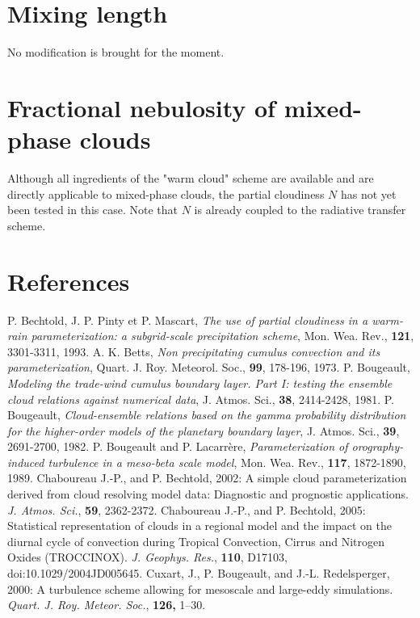 \section{Mixing length}

No modification is brought for the moment.

\section{Fractional nebulosity of mixed-phase clouds}

Although all ingredients of the "warm cloud" scheme are available and are
directly applicable to mixed-phase clouds, the partial cloudiness $N$ has not 
yet been tested in this case. Note that $N$ is already coupled to the radiative 
transfer scheme.




\section{References}

\por   P. { Bechtold}, J. P. { Pinty} et P. { Mascart},
           {\it The use of partial cloudiness in a warm-rain parameterization:
            a subgrid-scale precipitation scheme},
           Mon. Wea. Rev., {\bf 121}, 3301-3311, 1993.
\por  A. K. { Betts},
           {\it Non precipitating cumulus convection and its parameterization},
           Quart. J. Roy. Meteorol. Soc., {\bf 99}, 178-196, 1973.
\por  P. { Bougeault},
           {\it Modeling the trade-wind cumulus boundary layer.  Part I:
                testing the ensemble cloud relations against numerical data},
           J. Atmos. Sci., {\bf 38}, 2414-2428, 1981.
\por    P. { Bougeault},
           {\it Cloud-ensemble relations based on the gamma probability
           distribution for the higher-order models of the planetary
           boundary layer},
           J. Atmos. Sci., {\bf 39}, 2691-2700, 1982.
\por   P. { Bougeault} and P. { Lacarr\`ere},
           {\it Parameterization of orography-induced turbulence in a
                 meso-beta scale model},
           Mon. Wea. Rev., {\bf 117}, 1872-1890, 1989.
\por
Chaboureau J.-P., and P. Bechtold, 2002: A simple cloud parameterization derived from
cloud resolving model data: Diagnostic and prognostic applications.
{\it J. Atmos. Sci.}, {\bf 59}, 2362-2372.
\por
Chaboureau J.-P., and P. Bechtold, 2005: Statistical representation of clouds
in a regional model and the impact on the diurnal cycle of convection
during Tropical Convection, Cirrus and Nitrogen Oxides (TROCCINOX). 
{\it J. Geophys. Res.}, {\bf 110}, D17103, doi:10.1029/2004JD005645.
\por
Cuxart, J., P. Bougeault, and J.-L. Redelsperger, 2000:
A turbulence scheme allowing for mesoscale and large-eddy simulations.
{\it Quart. J. Roy. Meteor. Soc.}, {\bf 126,} 1--30.

